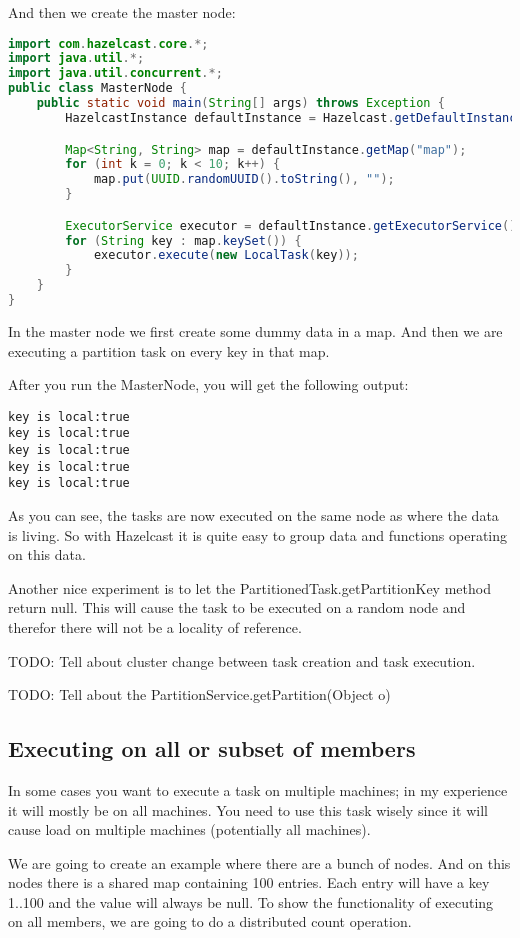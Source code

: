 And then we create the master node:
\begin{lstlisting}[language=java]
import com.hazelcast.core.*;
import java.util.*;
import java.util.concurrent.*;
public class MasterNode {
    public static void main(String[] args) throws Exception {
        HazelcastInstance defaultInstance = Hazelcast.getDefaultInstance();

        Map<String, String> map = defaultInstance.getMap("map");
        for (int k = 0; k < 10; k++) {
            map.put(UUID.randomUUID().toString(), "");
        }

        ExecutorService executor = defaultInstance.getExecutorService();
        for (String key : map.keySet()) {
            executor.execute(new LocalTask(key));
        }
    }
}
\end{lstlisting}
In the master node we first create some dummy data in a map. And then we are
executing a partition task on every key in that map. 

After you run the MasterNode, you will get the following output:
\begin{verbatim}
key is local:true
key is local:true
key is local:true
key is local:true
key is local:true
\end{verbatim}
As you can see, the tasks are now executed on the same node as where the data is living. 
So with Hazelcast it is quite easy to group data and functions operating on this data. 

Another nice experiment is to let the PartitionedTask.getPartitionKey method return null. This will cause the task to be executed on a random node and therefor there will not be a locality of reference.

TODO: Tell about cluster change between task creation and task execution.

TODO: Tell about the PartitionService.getPartition(Object o)

\subsection{Executing on all or subset of members}
In some cases you want to execute a task on multiple machines; in my experience it will mostly be on all machines. You need to use this task wisely since it will cause load on multiple machines (potentially all machines).

We are going to create an example where there are a bunch of nodes. And on this nodes there is a shared map containing 100 entries. Each entry will have a key 1..100 and the value will always be null. To show the functionality of executing on all members, we are going to do a distributed count operation.

